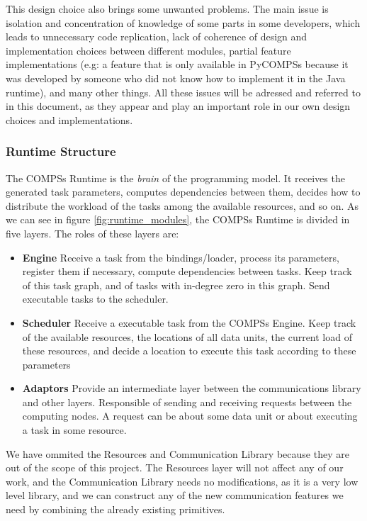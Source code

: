 This design choice also brings some unwanted problems. The main issue is isolation and concentration of knowledge of some parts in some developers, which leads to unnecessary code replication, lack of coherence of design and implementation choices between different modules, partial feature implementations (e.g: a feature that is only available in PyCOMPSs because it was developed by someone who did not know how to implement it in the Java runtime), and many other things. All these issues will be adressed and referred to in this document, as they appear and play an important role in our own design choices and implementations.

\subsubsection{Runtime Structure}
\label{subsec:runtime_structure}

The COMPSs Runtime is the \textit{brain} of the programming model. It receives the generated task parameters, computes dependencies between them, decides how to distribute the workload of the tasks among the available resources, and so on. As we can see in figure \ref{fig:runtime_modules}, the COMPSs Runtime is divided in five layers. The roles of these layers are:

\begin{itemize}
\item \textbf{Engine} Receive a task from the bindings/loader, process its parameters, register them if necessary, compute dependencies between tasks. Keep track of this task graph, and of tasks with in-degree zero in this graph. Send executable tasks to the scheduler.
\item \textbf{Scheduler} Receive a executable task from the COMPSs Engine. Keep track of the available resources, the locations of all data units, the current load of these resources, and decide a location to execute this task according to these parameters
\item \textbf{Adaptors} Provide an intermediate layer between the communications library and other layers. Responsible of sending and receiving requests between the computing nodes. A request can be about some data unit or about executing a task in some resource.
\end{itemize}

We have ommited the Resources and Communication Library because they are out of the scope of this project. The Resources layer will not affect any of our work, and the Communication Library needs no modifications, as it is a very low level library, and we can construct any of the new communication features we need by combining the already existing primitives.



